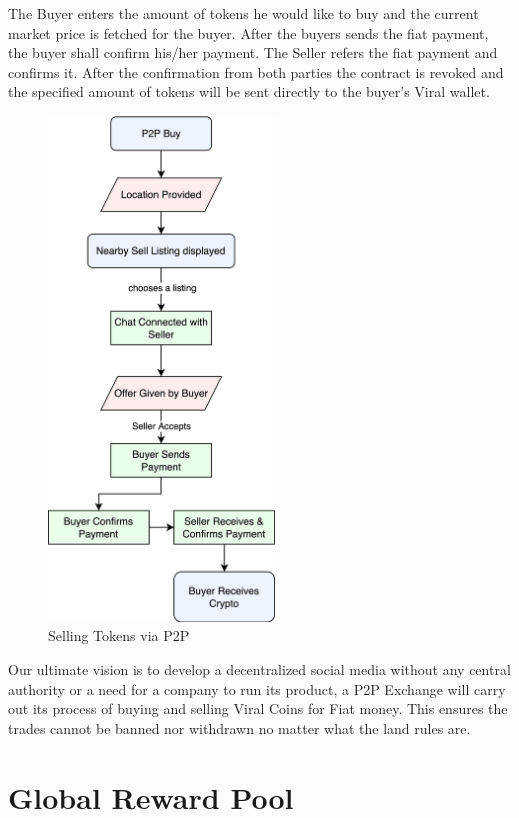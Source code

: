 \documentclass[10pt]{article}
\begin{document}
The Buyer enters the amount of tokens he would like to buy and the current market price is fetched for the buyer. After the buyers sends the fiat payment, the buyer shall confirm his/her payment. The Seller refers the fiat payment and confirms it. After the confirmation from both parties the contract is revoked and the specified amount of tokens will be sent directly to the buyer's Viral wallet.\\

\begin{figure}[H]
\begin{center}
\includegraphics[width=6cm]{p2p-buy}
\caption{Selling Tokens via P2P}
\end{center}
\end{figure}

Our ultimate vision is to develop a decentralized social media without any central authority or a need for a company to run its product, a P2P Exchange will carry out its process of buying and selling Viral Coins for Fiat money. This ensures the trades cannot be banned nor withdrawn no matter what the land rules are.\\

\newpage

\section{Global Reward Pool}
\end{document}
